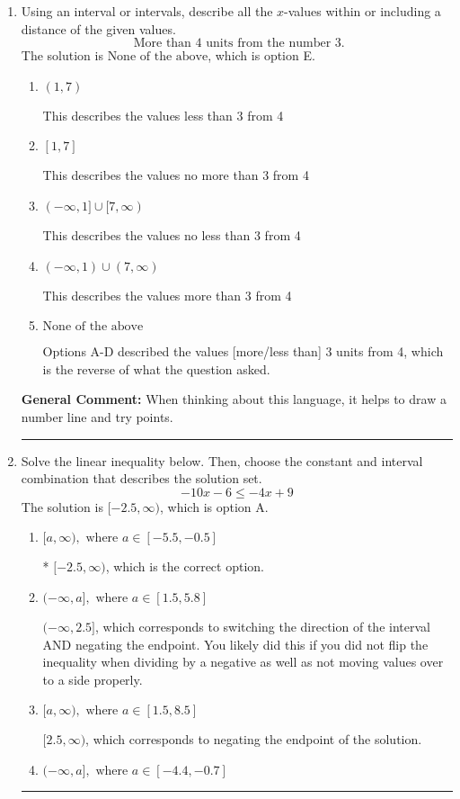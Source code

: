 \documentclass{extbook}[14pt]
\newcommand{\litem}[1]{\item #1

\rule{\textwidth}{0.4pt}}
\begin{document}
\begin{enumerate}\litem{
Using an interval or intervals, describe all the $x$-values within or including a distance of the given values.
\[ \text{ More than } 4 \text{ units from the number } 3. \]
The solution is \( \text{None of the above} \), which is option E.\begin{enumerate}[label=\Alph*.]
\item \( (1, 7) \)

This describes the values less than 3 from 4
\item \( [1, 7] \)

This describes the values no more than 3 from 4
\item \( (-\infty, 1] \cup [7, \infty) \)

This describes the values no less than 3 from 4
\item \( (-\infty, 1) \cup (7, \infty) \)

This describes the values more than 3 from 4
\item \( \text{None of the above} \)

Options A-D described the values [more/less than] 3 units from 4, which is the reverse of what the question asked.
\end{enumerate}

\textbf{General Comment:} When thinking about this language, it helps to draw a number line and try points.
}
\litem{
Solve the linear inequality below. Then, choose the constant and interval combination that describes the solution set.
\[ -10x -6 \leq -4x + 9 \]
The solution is \( [-2.5, \infty) \), which is option A.\begin{enumerate}[label=\Alph*.]
\item \( [a, \infty), \text{ where } a \in [-5.5, -0.5] \)

* $[-2.5, \infty)$, which is the correct option.
\item \( (-\infty, a], \text{ where } a \in [1.5, 5.8] \)

 $(-\infty, 2.5]$, which corresponds to switching the direction of the interval AND negating the endpoint. You likely did this if you did not flip the inequality when dividing by a negative as well as not moving values over to a side properly.
\item \( [a, \infty), \text{ where } a \in [1.5, 8.5] \)

 $[2.5, \infty)$, which corresponds to negating the endpoint of the solution.
\item \( (-\infty, a], \text{ where } a \in [-4.4, -0.7] \)


\end{enumerate}}
\end{enumerate}
\end{document}
